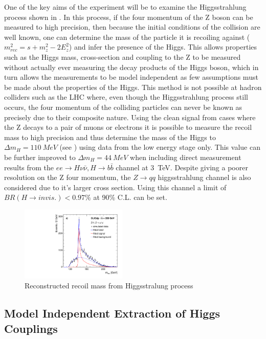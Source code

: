 One of the key aims of the experiment will be to examine the Higgsstrahlung process shown in . In this process, if the four momentum of the Z boson can be measured to high precision, then because the initial conditions of the collision are well known, one can determine the mass of the particle it is recoiling against ($m_{rec}^{2} = s + m_{z}^{2} - 2E_{z}^{2}$) and infer the presence of the Higgs. This allows properties such as the Higgs mass, cross-section and coupling to the Z to be measured without actually ever measuring the decay products of the Higgs boson, which in turn allows the measurements to be model independent as few assumptions must be made about the properties of the Higgs. This method is not possible at hadron colliders such as the LHC where, even though the Higgsstrahlung process still occurs, the four momentum of the colliding particles can never be known as precisely due to their composite nature. Using the clean signal from cases where the Z decays to a pair of muons or electrons it is possible to measure the recoil mass to high precision and thus determine the mass of the Higgs to $\Delta m_{H} = 110~MeV$ (see ) using data from the low energy stage only. This value can be further improved to $\Delta m_{H} = 44~MeV$ when including direct measurement results from the $ee\rightarrow H\nu\bar{\nu}, H\rightarrow b\bar{b}$ channel at 3~TeV. Despite giving a poorer resolution on the Z four momentum, the $Z\rightarrow qq$ higgsstrahlung channel is also considered due to it's larger cross section. Using this channel a limit of $BR(H\rightarrow invis.) <0.97\%$ at 90\% C.L. can be set. 

\begin{figure}
  \centering
  \includegraphics[width=0.45\textwidth,keepaspectratio]{Theory/fig/350GeV_Recoil_mumuX_MrecoilFit.pdf}
  \caption[Reconstructed recoil mass from Higgsstralung process]{Reconstructed recoil mass from Higgsstralung process \cite{Abramowicz:2016zbo}}
  \label{fig:higgsmass}
\end{figure}

 
\subsection{Model Independent Extraction of Higgs Couplings}


